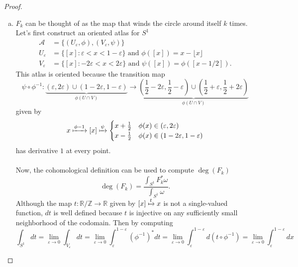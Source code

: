 \documentclass{article}
\begin{document}
\begin{proof} \text{} \\
  \begin{enumerate}[(a)]
    \item $F_k$ can be thought of as the map that winds the circle around
      itself $k$ times.
      Let's first construct an oriented atlas for $S^1$ \begin{align*}
        \mathcal{A} &= \{(U_\varepsilon, \phi), (V_\varepsilon, \psi)\}\\
        U_\varepsilon &= \{ [x] : \varepsilon < x < 1 - \varepsilon \} \text{ and } \phi([x]) = x - \lfloor x \rfloor \\
        V_\varepsilon &= \{ [x] : -2\varepsilon < x < 2\varepsilon \} \text{ and } \psi([x]) = \phi([x - 1/2]).
      \end{align*}
      This atlas is oriented because the transition map \[
        \psi \circ \phi^{-1}\colon
          \underbrace{(\varepsilon, 2\varepsilon) \cup (1-2\varepsilon, 1 - \varepsilon)}_{\phi(U \cap V)}
          \rightarrow
          \underbrace{\left(\frac{1}{2}-2\varepsilon, \frac{1}{2} - \varepsilon\right) \cup \left(\frac{1}{2} + \varepsilon, \frac{1}{2} + 2\varepsilon\right)}_{\phi(U \cap V)}
      \] given by \[
        x \xmapsto{\phi{-1}} [x] \xmapsto{\psi} \begin{cases}
          x + \frac{1}{2} & \phi(x) \in (\varepsilon, 2\varepsilon)\\
          x - \frac{1}{2} & \phi(x) \in (1 - 2\varepsilon, 1 - \varepsilon)
        \end{cases}
      \] has derivative $1$ at every point.
      \\~\\
      Now, the cohomological definition can be used to compute $\deg(F_k)$ \[
        \deg(F_k) = \frac{\displaystyle\int_{S^1} F_k^*\omega}{\displaystyle\int_{S^1} \omega}.
      \] Although the map
      $t\colon \mathbb{R}/\mathbb{Z} \rightarrow \mathbb{R}$
      given by $[x] \xmapsto{t} x$ is not a single-valued function, $dt$ is
      well defined because $t$ is injective on any sufficiently small
      neighborhood of the codomain.
      Then by computing \[
        \int_{S^1}dt
          = \lim_{\varepsilon \rightarrow 0} \int_{V_\varepsilon}dt
          = \lim_{\varepsilon \rightarrow 0} \int_\varepsilon^{1 - \varepsilon} (\phi^{-1})^*dt
          = \lim_{\varepsilon \rightarrow 0} \int_\varepsilon^{1 - \varepsilon} d(t \circ \phi^{-1})
          = \lim_{\varepsilon \rightarrow 0} \int_\varepsilon^{1 - \varepsilon} dx
\]
\end{enumerate}
\end{proof}
\end{document}
